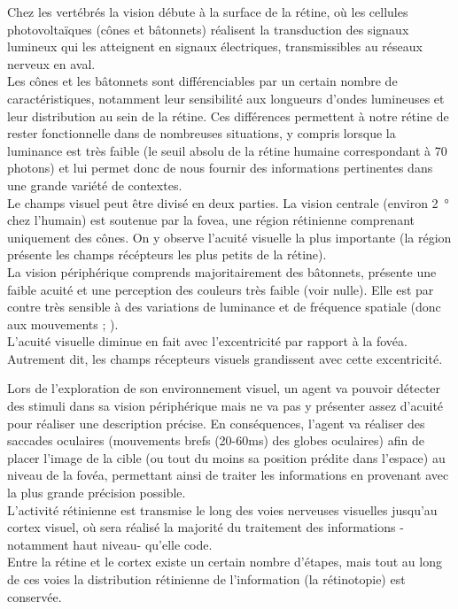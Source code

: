 Chez les vertébrés la vision débute à la surface de la rétine, où les cellules photovoltaïques (cônes et bâtonnets) réalisent la transduction des signaux lumineux qui les atteignent en signaux électriques, transmissibles au réseaux nerveux en aval.\\
Les cônes et les bâtonnets sont différenciables par un certain nombre de caractéristiques, notamment leur sensibilité aux longueurs d'ondes lumineuses et leur distribution au sein de la rétine. Ces différences permettent à notre rétine de rester fonctionnelle dans de nombreuses situations, y compris lorsque la luminance est très faible (le seuil absolu de la rétine humaine correspondant à 70 photons) et lui permet donc de nous fournir des informations pertinentes dans une grande variété de contextes.\\
Le champs visuel peut être divisé en deux parties. La vision centrale (environ \SI{2}{\degree} chez l'humain) est soutenue par la fovea, une région rétinienne comprenant uniquement des cônes. On y observe l'acuité visuelle la plus importante (la région présente les champs récépteurs les plus petits de la rétine).\\
La vision périphérique comprends majoritairement des bâtonnets, présente une faible acuité et une perception des couleurs très faible (voir nulle). Elle est par contre très sensible à des variations de luminance et de fréquence spatiale (donc aux mouvements ;  \cite{Werner2014}).\\
 L'acuité visuelle diminue en fait avec l'excentricité par rapport à la fovéa. Autrement dit, les champs récepteurs visuels grandissent avec cette excentricité.

Lors de l'exploration de son environnement visuel, un agent va pouvoir détecter des stimuli dans sa vision périphérique mais ne va pas y présenter assez d'acuité pour réaliser une description précise.
En conséquences, l'agent va réaliser des saccades oculaires (mouvements brefs (20-60\si{\milli\second}) des globes oculaires) afin de placer l'image de la cible (ou tout du moins sa position prédite dans l'espace) au niveau de la fovéa, permettant ainsi de traiter les informations en provenant avec la plus grande précision possible.\\

L'activité rétinienne est transmise le long des voies nerveuses visuelles jusqu'au cortex visuel, où sera réalisé la majorité du traitement des informations -notamment haut niveau- qu'elle code. \\
Entre la rétine et le cortex existe un certain nombre d'étapes, mais tout au long de ces voies la distribution rétinienne de l'information (la rétinotopie) est conservée. 

